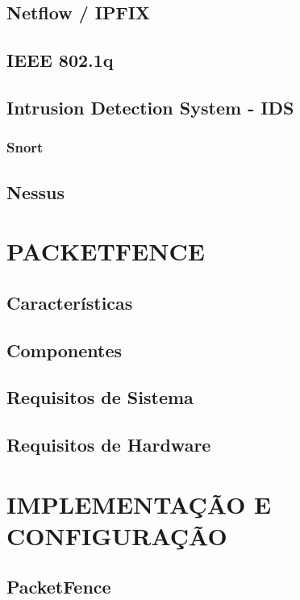 \documentclass[12pt, brazil, ruledheader, pnumromarab,normaltoc]{abnt}
\begin{document}
\section{Netflow / IPFIX} \label{sec:netflow}

\section{IEEE 802.1q}

\section{Intrusion Detection System - IDS}
\subsection{Snort}

\section{Nessus}


\chapter{PACKETFENCE}

\section{Características}

\section{Componentes}

\section{Requisitos de Sistema}

\section{Requisitos de Hardware}


\chapter{IMPLEMENTAÇÃO E CONFIGURAÇÃO}

\section{PacketFence}
\end{document}
